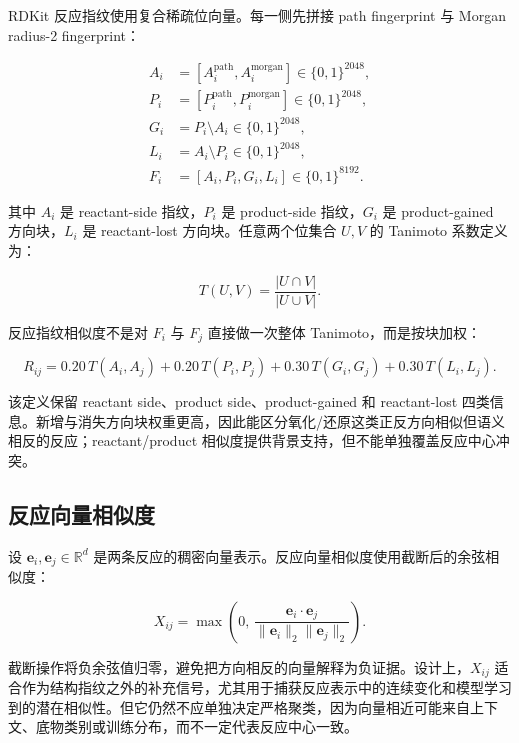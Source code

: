 \documentclass[11pt]{article}
\numberwithin{equation}{section}
\begin{document}
RDKit 反应指纹使用复合稀疏位向量。每一侧先拼接 path fingerprint 与 Morgan radius-2 fingerprint：

\begin{equation}
\begin{aligned}
A_i &= [A_i^{\mathrm{path}}, A_i^{\mathrm{morgan}}] \in \{0,1\}^{2048},\\
P_i &= [P_i^{\mathrm{path}}, P_i^{\mathrm{morgan}}] \in \{0,1\}^{2048},\\
G_i &= P_i \setminus A_i \in \{0,1\}^{2048},\\
L_i &= A_i \setminus P_i \in \{0,1\}^{2048},\\
F_i &= [A_i, P_i, G_i, L_i] \in \{0,1\}^{8192}.
\end{aligned}
\end{equation}

其中 \(A_i\) 是 reactant-side 指纹，\(P_i\) 是 product-side 指纹，\(G_i\) 是 product-gained 方向块，\(L_i\) 是 reactant-lost 方向块。任意两个位集合 \(U,V\) 的 Tanimoto 系数定义为：

\begin{equation}
T(U,V)
=
\frac{|U \cap V|}{|U \cup V|}.
\end{equation}

反应指纹相似度不是对 \(F_i\) 与 \(F_j\) 直接做一次整体 Tanimoto，而是按块加权：

\begin{equation}
R_{ij}
=
0.20\,T(A_i,A_j)
+0.20\,T(P_i,P_j)
+0.30\,T(G_i,G_j)
+0.30\,T(L_i,L_j).
\end{equation}

该定义保留 reactant side、product side、product-gained 和 reactant-lost 四类信息。新增与消失方向块权重更高，因此能区分氧化/还原这类正反方向相似但语义相反的反应；reactant/product 相似度提供背景支持，但不能单独覆盖反应中心冲突。

\subsection{反应向量相似度}

设 \(\mathbf e_i,\mathbf e_j \in \mathbb R^d\) 是两条反应的稠密向量表示。反应向量相似度使用截断后的余弦相似度：

\begin{equation}
X_{ij}
=
\max\left(
0,\,
\frac{\mathbf e_i \cdot \mathbf e_j}
{\|\mathbf e_i\|_2 \|\mathbf e_j\|_2}
\right).
\end{equation}

截断操作将负余弦值归零，避免把方向相反的向量解释为负证据。设计上，\(X_{ij}\) 适合作为结构指纹之外的补充信号，尤其用于捕获反应表示中的连续变化和模型学习到的潜在相似性。但它仍然不应单独决定严格聚类，因为向量相近可能来自上下文、底物类别或训练分布，而不一定代表反应中心一致。
\end{document}
